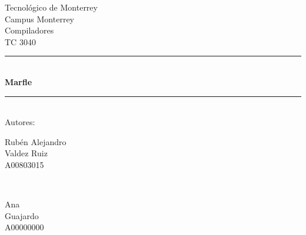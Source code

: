 \begin{titlepage}

\newcommand{\HRule}{\rule{\linewidth}{0.5mm}} %


\center %
 

\textsf{\LARGE Tecnológico de Monterrey}\\[0.5cm] %
\textsf{\LARGE Campus Monterrey}\\[1.5cm]
\textsf{\Large Compiladores}\\[0.5cm] %
\textsf{\large TC 3040}\\[0.5cm] %


\HRule \\[0.4cm]
{ \huge \bfseries Marfle}\\[0.4cm] %
\HRule \\[1.5cm]
\textsf{\large Autores:}\\[0.5cm]

\begin{minipage}{0.4\textwidth}
\begin{flushleft} \large
Rubén Alejandro\\ Valdez Ruiz\\ %
A00803015
\end{flushleft}
\end{minipage}
~
\begin{minipage}{0.4\textwidth}
\begin{flushright} \large
Ana\\ Guajardo\\ A00000000 %
\end{flushright}
\end{minipage}\\[2cm]


\end{titlepage}
